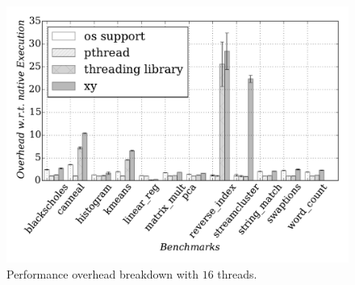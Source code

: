 
\begin{figure}[t]
\centering
\includegraphics[scale=0.46]{figure/benchmarks/times-16-threads.pdf}
\caption{Performance overhead breakdown with $16$ threads.}
\label{fig:overheads-breakdown}
\end{figure}
